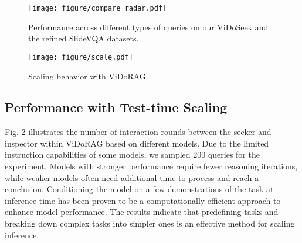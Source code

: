 \begin{figure}[!h]
    \centering 
    \texttt{[image: figure/compare\_radar.pdf]}
    \caption{Performance across different types of queries on our ViDoSeek and the refined SlideVQA datasets.}
    \label{fig:compare_radar}
\end{figure}

\begin{figure}[!h]
    \centering 
    \texttt{[image: figure/scale.pdf]}
    \caption{Scaling behavior with ViDoRAG.}
    \label{fig:scale}
\end{figure}

\subsection{Performance with Test-time Scaling}

Fig. \ref{fig:scale} illustrates the number of interaction rounds between the seeker and inspector within ViDoRAG based on different models. 
Due to the limited instruction capabilities of some models, we sampled 200 queries for the experiment.
Models with stronger performance require fewer reasoning iterations, while weaker models often need additional time to process and reach a conclusion.
Conditioning the model on a few demonstrations of the task at inference time has been proven to be a computationally efficient approach to enhance model performance\cite{brown2020language,min2021metaicl}. 
The results indicate that predefining tasks and breaking down complex tasks into simpler ones is an effective method for scaling inference.
